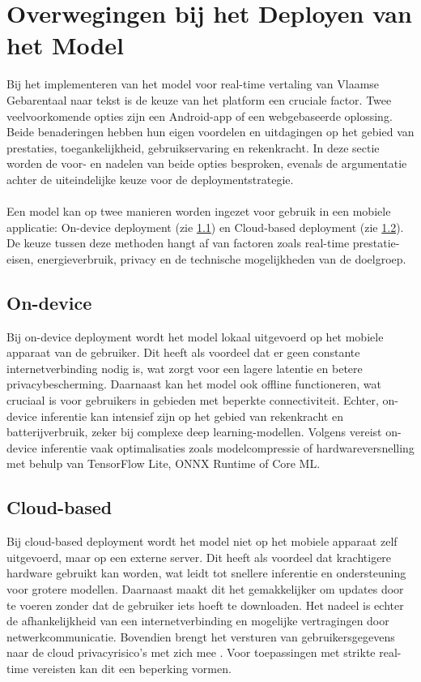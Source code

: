 \section{Overwegingen bij het Deployen van het Model}
Bij het implementeren van het model voor real-time vertaling van Vlaamse Gebarentaal naar tekst is de keuze van het platform een cruciale factor. 
Twee veelvoorkomende opties zijn een Android-app of een webgebaseerde oplossing. Beide benaderingen hebben hun eigen voordelen en uitdagingen op het gebied van prestaties, toegankelijkheid, gebruikservaring en rekenkracht. 
In deze sectie worden de voor- en nadelen van beide opties besproken, evenals de argumentatie achter de uiteindelijke keuze voor de deploymentstrategie.
\\
\\
Een model kan op twee manieren worden ingezet voor gebruik in een mobiele applicatie: On-device deployment (zie \ref{subsec:on-device}) en Cloud-based deployment (zie \ref{subsec:cloud-based}).
De keuze tussen deze methoden hangt af van factoren zoals real-time prestatie-eisen, energieverbruik, privacy en de technische mogelijkheden van de doelgroep.
\subsection{On-device}
\label{subsec:on-device}
Bij on-device deployment wordt het model lokaal uitgevoerd op het mobiele apparaat van de gebruiker. 
Dit heeft als voordeel dat er geen constante internetverbinding nodig is, wat zorgt voor een lagere latentie en betere privacybescherming. 
Daarnaast kan het model ook offline functioneren, wat cruciaal is voor gebruikers in gebieden met beperkte connectiviteit. 
Echter, on-device inferentie kan intensief zijn op het gebied van rekenkracht en batterijverbruik, zeker bij complexe deep learning-modellen. 
Volgens \textcite{8360327} vereist on-device inferentie vaak optimalisaties zoals modelcompressie of hardwareversnelling met behulp van TensorFlow Lite, ONNX Runtime of Core ML.

\subsection{Cloud-based}
\label{subsec:cloud-based}
Bij cloud-based deployment wordt het model niet op het mobiele apparaat zelf uitgevoerd, maar op een externe server. 
Dit heeft als voordeel dat krachtigere hardware gebruikt kan worden, wat leidt tot snellere inferentie en ondersteuning voor grotere modellen. 
Daarnaast maakt dit het gemakkelijker om updates door te voeren zonder dat de gebruiker iets hoeft te downloaden. 
Het nadeel is echter de afhankelijkheid van een internetverbinding en mogelijke vertragingen door netwerkcommunicatie. 
Bovendien brengt het versturen van gebruikersgegevens naar de cloud privacyrisico’s met zich mee \autocite{8360327}.
Voor toepassingen met strikte real-time vereisten kan dit een beperking vormen.

